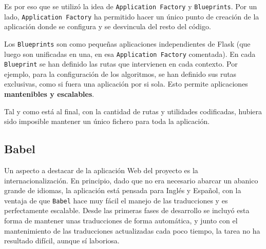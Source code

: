 Es por eso que se utilizó la idea de \texttt{Application Factory} y
\texttt{Blueprints}. Por un lado, \texttt{Application Factory} ha permitido
hacer un único punto de creación de la aplicación donde se configura y se
desvincula del resto del código.

Los \texttt{Blueprints} son como pequeñas aplicaciones independientes de Flask
(que luego son unificadas en una, en esa \texttt{Application Factory}
comentada). En cada \texttt{Blueprint} se han definido las rutas que intervienen
en cada contexto. Por ejemplo, para la configuración de los algoritmos, se han
definido sus rutas exclusivas, como si fuera una aplicación por si sola. Esto
permite aplicaciones \textbf{mantenibles y escalables}.

Tal y como está al final, con la cantidad de rutas y utilidades codificadas,
hubiera sido imposible mantener un único fichero para toda la aplicación.

\subsection{Babel}

Un aspecto a destacar de la aplicación Web del proyecto es la
internacionalización. En principio, dado que no era necesario abarcar un abanico
grande de idiomas, la aplicación está pensada para Inglés y Español, con la
ventaja de que \texttt{Babel} hace muy fácil el manejo de las traducciones y es
perfectamente escalable. Desde las primeras fases de desarrollo se incluyó esta
forma de mantener unas traducciones de forma automática, y junto con el
mantenimiento de las traducciones actualizadas cada poco tiempo, la tarea no ha
resultado difícil, aunque sí laboriosa.